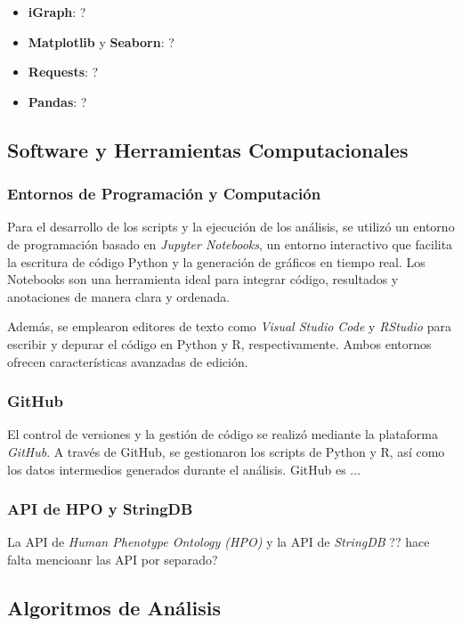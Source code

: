 \begin{itemize}
	\item \textbf{iGraph}: ?
	\item \textbf{Matplotlib} y \textbf{Seaborn}: ?
	
	\item \textbf{Requests}: ?
	\item \textbf{Pandas}: ?
\end{itemize}

\subsection{Software y Herramientas Computacionales}

\subsubsection{Entornos de Programación y Computación}
Para el desarrollo de los scripts y la ejecución de los análisis, se utilizó un entorno de programación basado en \textit{Jupyter Notebooks}, un entorno interactivo que facilita la escritura de código Python y la generación de gráficos en tiempo real. Los Notebooks son una herramienta ideal para integrar código, resultados y anotaciones de manera clara y ordenada.

Además, se emplearon editores de texto como \textit{Visual Studio Code} y \textit{RStudio} para escribir y depurar el código en Python y R, respectivamente. Ambos entornos ofrecen características avanzadas de edición.

\subsubsection{GitHub}
El control de versiones y la gestión de código se realizó mediante la plataforma \textit{GitHub}. A través de GitHub, se gestionaron los scripts de Python y R, así como los datos intermedios generados durante el análisis. GitHub es ...

\subsubsection{API de HPO y StringDB}
La API de \textit{Human Phenotype Ontology (HPO)} y la API de \textit{StringDB} ?? hace falta mencioanr las API por separado?

\subsection{Algoritmos de Análisis}

